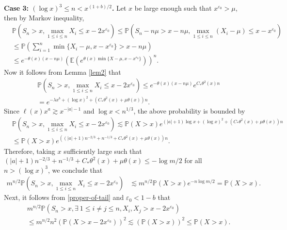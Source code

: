 \documentclass[10pt,a4paper]{amsart}
\numberwithin{equation}{section}
\begin{document}
\noindent
{\bf Case 3: $(\log x)^3\leq n <x^{(1+b)/2}$.}
Let $x$ be large enough such that $x^{\varepsilon_0}>\mu$,  then by Markov inequality, 
\begin{align}\label{e33-2}
	&\mathbb{P}\left(S_n >x, \max_{1\leq i\leq n} X_i \leq x-2x^{\varepsilon_0} \right)  \leq \mathbb{P}\left(S_n-n\mu >x-n\mu, \max_{1\leq i\leq n} (X_i-\mu) \leq x-x^{\varepsilon_0} \right) \nonumber\\
	& \leq  \mathbb{P}\left(\sum_{i=1}^n \min\{ X_i-\mu, x-x^{\varepsilon_0}\}>x-n\mu \right)\nonumber\\
	& \leq e^{-\theta(x)(x-n\mu)}\left(\mathbb{E}\left( e^{\theta(x) \min\{ X-\mu, x-x^{\varepsilon_0}\} } \right)\right)^n.
\end{align}
Now it follows from Lemma \ref{lem2} that 
\begin{align}\label{e8-1}
	& \mathbb{P}\left(S_n >x, \max_{1\leq i\leq n} X_i \leq x-2x^{\varepsilon_0} \right) \leq e^{-\theta(x)(x-n\mu)} e^{C_*\theta^2(x)n}\nonumber\\
	&=  e^{-\lambda x^{b} +(\log x)^2+\left(C_*\theta^2(x)+ \mu \theta(x) \right)n}.
\end{align}
Since $\ell(x)x^a \gtrsim x^{-|a|-1}$ and  $\log x<n^{1/3}$, the above probability is bounded by
\begin{align}
	& \mathbb{P}\left(S_n >x, \max_{1\leq i\leq n} X_i \leq x-2x^{\varepsilon_0} \right)  \lesssim \mathbb{P}(X>x) e^{ (|a|+1)\log x +(\log x)^2+\left(C_*\theta^2(x)+ \mu \theta(x) \right)n}\nonumber\\
	& \leq \mathbb{P}(X>x) e^{ \left((|a|+1)n^{-2/3} +n^{-1/3}+C_*\theta^2(x)+ \mu \theta(x) \right)n}. 
\end{align}
Therefore, taking $x$ sufficiently large such that 
$(|a|+1)n^{-2/3} +n^{-1/3}+C_*\theta^2(x) + \mu \theta(x) \leq -\log m/2$ for all $n> (\log x)^3$, we conclude that 
\begin{align}\label{e9-1}
		m^{n/2}\mathbb{P}\left(S_n >x, \max_{1\leq i\leq n} X_i \leq x-2x^{\varepsilon_0} \right)&  \lesssim m^{n/2} \mathbb{P}(X>x) e^{-n\log m/2} =  \mathbb{P}(X>x) .
\end{align}
Next, it follows from \eqref{proper-of-tail} and  $\varepsilon_0<1-b$ that
\begin{align}\label{e9-2}
	& m^{n/2} \mathbb{P}\left(S_n >x,  \exists\  1\leq  i\neq j\leq n, X_i, X_j > x-2x^{\varepsilon_0} \right) \nonumber\\
	& \leq m^{n/2} n^2 \left(\mathbb{P}(X> x-2x^{\varepsilon_0})\right)^2 \lesssim   \left(\mathbb{P}(X> x)\right)^2 \leq  \mathbb{P}(X> x).
\end{align}
\end{document}
